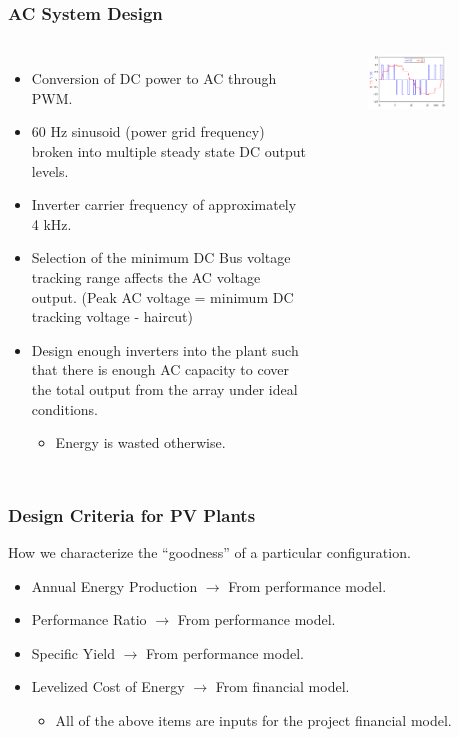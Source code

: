 \documentclass[aspectratio=169]{beamer}
\begin{document}
\begin{frame}
  \frametitle{AC System Design}
  \begin{columns}[t]
    \begin{itemize}
    \item Conversion of DC power to AC through PWM.
    \item 60 Hz sinusoid (power grid frequency) broken into multiple
      steady state DC output levels.
    \item Inverter carrier frequency of approximately 4 kHz.
    \item Selection of the minimum DC Bus voltage tracking range
      affects the AC voltage output. (Peak AC voltage = minimum DC
      tracking voltage - haircut)
    \item Design enough inverters into the plant such that there is
      enough AC capacity to cover the total output from the array
      under ideal conditions.
      \begin{itemize}
      \item Energy is wasted otherwise.
      \end{itemize}
    \end{itemize}

    \begin{figure}
      \includegraphics[width=0.75\textwidth]{PWM.png}
    \end{figure}    
  \end{columns}
\end{frame}


\begin{frame}
\frametitle{Design Criteria for PV Plants}
How we characterize the ``goodness'' of a particular configuration.
\begin{itemize}
\item Annual Energy Production $\rightarrow$ From performance model.
\item Performance Ratio $\rightarrow$ From performance model.
\item Specific Yield $\rightarrow$ From performance model.
\item Levelized Cost of Energy $\rightarrow$ From financial model.
  \begin{itemize}
  \item All of the above items are inputs for the project financial model.
  \end{itemize}
\end{itemize}
\end{frame}
\end{document}
